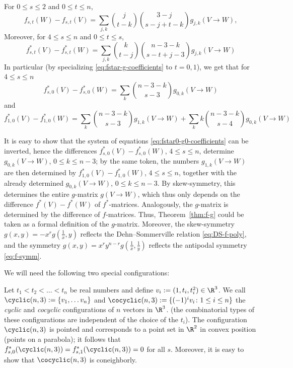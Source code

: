 \begin{corollary} 
\label{cor:f-g-fstar-gstar-coefficients}
For $0\leq s\leq 2$ and $0\leq t\leq n$,
\begin{equation}
\label{eq:f-g-coefficients}
f_{s,t}(W)-f_{s,t}(V) = \sum_{j,k} \binom{j}{t-k}\binom{3-j}{s-j+t-k} g_{j,k}(V\to W),
\end{equation}
Moreover, for $4\leq s \leq n$ and $0\leq t \leq s$,
\begin{equation}
\label{eq:fstar-g-coefficients}
f^*_{s,t}(V)-f^*_{s,t}(W) = \sum_{j,k} \binom{k}{t-j}\binom{n-3-k}{s-t+j-3}g_{j,k}(V\to W)
\end{equation}
In particular (by specializing \eqref{eq:fstar-g-coefficients} to $t=0,1$), we get that for $4\leq s \leq n$
\begin{equation}
\label{eq:fstar0-g0-coefficients}
f^*_{s,0}(V)-f^*_{s,0}(W) = \sum_{k} \binom{n-3-k}{s-3}g_{0,k}(V\to W)
\end{equation}
and
\begin{equation}
\label{eq:fstar-g1-coefficients}
\textstyle f^*_{1,0}(V)-f^*_{1,0}(W) = \sum_{k} \binom{n-3-k}{s-3}g_{1,k}(V\to W) + \sum_{k}k\binom{n-3-k}{s-4}g_{0,k}(V\to W)
\end{equation}
\end{corollary}
\begin{remark} 
\label{rem:g-f+DS-g}
It is easy to show that the system of equations \eqref{eq:fstar0-g0-coefficients} can be inverted, hence the differences $f^*_{s,0}(V)-f^*_{s,0}(W)$, $4\leq s\leq n$, determine $g_{0,k}(V\to W)$, $0\leq k\leq n-3$; by the same token, the numbers $g_{1,k}(V\to W)$ are then determined by $f^*_{1,0}(V)-f^*_{1,0}(W)$, $4\leq s\leq n$, together with the already determined $g_{0,k}(V\to W)$, $0\leq k\leq n-3$. By skew-symmetry, this determines the entire $g$-matrix $g(V\to W)$, which thus only depends on the difference $f^*(V)-f^*(W)$ of $f^*$-matrices. Analogously, the $g$-matrix is determined by the difference of $f$-matrices. Thus, Theorem~\ref{thm:f-g} could be taken as a formal definition of the $g$-matrix.
Moreover, the skew-symmetry $g(x,y)=-x^r g(\frac{1}{x},y)$ reflects the Dehn--Sommerville relation \eqref{eq:DS-f-poly}, and the symmetry $g(x,y)=x^ry^{n-r}g(\frac{1}{x},\frac{1}{y})$ reflects the antipodal symmetry \eqref{eq:f-symm}.
\end{remark}
%
We will need the following two special configurations: 
\begin{example}
\label{ex:cyclic-cocyclic}
Let $t_1<t_2<\dots<t_n$ be real numbers and define $v_i:= (1,t_i,t_i^2) \in \R^3$. We call $\cyclic(n,3):=\{v_1,\dots v_n\}$ and $\cocyclic(n,3):=\{(-1)^i v_i\colon 1\leq i\leq n\}$ the \emph{cyclic} and \emph{cocyclic} configurations of $n$ vectors in $\R^3$.
 (the combinatorial types of these configurations are independent of the choice of the $t_i$). 
 The configuration $\cyclic(n,3)$ is pointed and corresponds to a point set in $\R^2$ in convex position (points on a parabola); it follows that $f^*_{s,0}(\cyclic(n,3))=f^*_{s,1}(\cyclic(n,3))=0$ for all $s$. Moreover, it is easy to show \cite[Lemma~3.5.1]{Matousek:2003aa} that 
$\cocyclic(n,3)$ is coneighborly.
\end{example}
